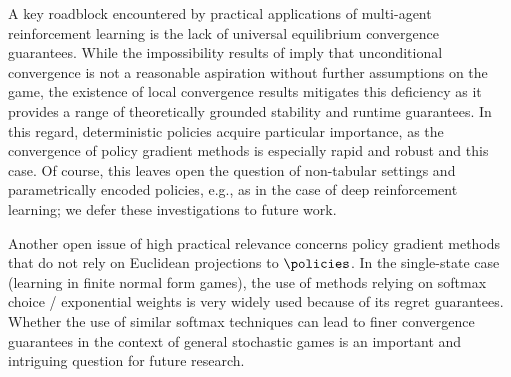 

A key roadblock encountered by practical applications of multi-agent reinforcement learning is the lack of universal equilibrium convergence guarantees.
While the impossibility results of \cite{HMC00,HMC03} imply that unconditional convergence is not a reasonable aspiration without further assumptions on the game, the existence of local convergence results mitigates this deficiency as it provides a range of theoretically grounded stability and runtime guarantees.
In this regard, deterministic policies acquire particular importance, as the convergence of policy gradient methods is especially rapid and robust and this case.
\beginrev
Of course, this leaves open the question of non-tabular settings and parametrically encoded policies, e.g., as in the case of deep reinforcement learning;
we defer these investigations to future work.

Another open issue of high practical relevance concerns policy gradient methods that do not rely on Euclidean projections to $\policies$.
In the single-state case (\ie learning in finite normal form games), the use of methods relying on softmax choice / exponential weights is very widely used because of its regret guarantees.
Whether the use of similar softmax techniques can lead to finer convergence guarantees in the context of general stochastic games is an important and intriguing question for future research.
\endedit